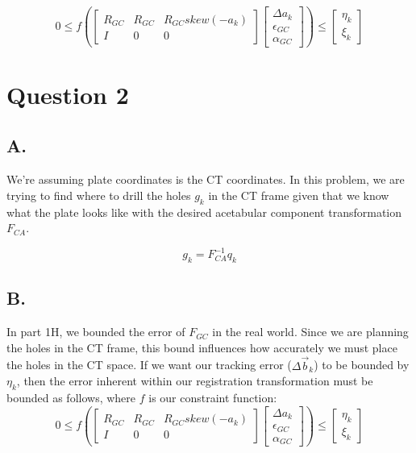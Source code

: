 \documentclass[letterpaper, 11pt]{article}
\begin{document}
$$ 0 \leq f\left(\begin{bmatrix} 
			R_{GC} & R_{GC} & R_{GC}skew(-a_k) \\
            I & 0 & 0
          \end{bmatrix}
          \begin{bmatrix}
    		\Delta a_k \\
        	\epsilon_{GC} \\
        	\alpha_{GC}
    	  \end{bmatrix}\right) \leq \begin{bmatrix}
          						\eta_k \\
                                \xi_k
                              \end{bmatrix} $$

\section*{Question 2}
\subsection*{A.}

We're assuming plate coordinates is the CT coordinates. In this problem, we are trying to find where to drill the holes $g_k$ in the CT frame given that we know what the plate looks like with the desired acetabular component transformation $F_{CA}$.

$$g_k=F^{-1}_{CA}q_k$$

\subsection*{B.}
In part 1H, we bounded the error of $F_{GC}$ in the real world. Since we are planning the holes in the CT frame, this bound influences how accurately we must place the holes in the CT space. If we want our tracking error ($\Delta \vec{b}_k$) to be bounded by $\eta_k$, then the error inherent within our registration transformation must be bounded as follows, where $f$ is our constraint function:
$$ 0 \leq f\left(\begin{bmatrix} 
			R_{GC} & R_{GC} & R_{GC}skew(-a_k) \\
            I & 0 & 0
          \end{bmatrix}
          \begin{bmatrix}
    		\Delta a_k \\
        	\epsilon_{GC} \\
        	\alpha_{GC}
    	  \end{bmatrix}\right) \leq \begin{bmatrix}
          						\eta_k \\
                                \xi_k
                              \end{bmatrix} $$
\end{document}
